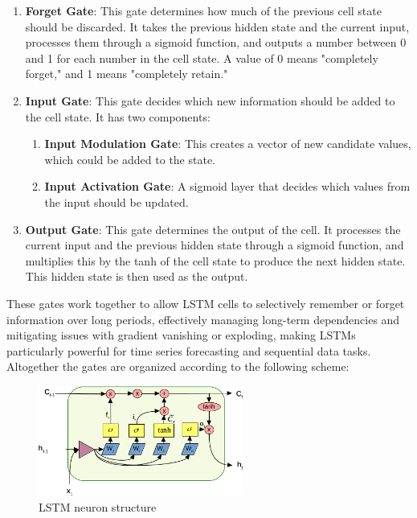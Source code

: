 \documentclass[sn-apa]{sn-jnl}%
\begin{document}
\begin{enumerate}
\item \textbf{Forget Gate}: This gate determines how much of the previous cell state should be discarded. It takes the previous hidden state and the current input, processes them through a sigmoid function, and outputs a number between 0 and 1 for each number in the cell state. A value of 0 means "completely forget," and 1 means "completely retain."

\item \textbf{Input Gate}: This gate decides which new information should be added to the cell state. It has two components:
\begin{enumerate}
\item \textbf{Input Modulation Gate}: This creates a vector of new candidate values, which could be added to the state.
\item \textbf{Input Activation Gate}: A sigmoid layer that decides which values from the input should be updated.
\end{enumerate}
\item \textbf{Output Gate}: This gate determines the output of the cell. It processes the current input and the previous hidden state through a sigmoid function, and multiplies this by the tanh of the cell state to produce the next hidden state. This hidden state is then used as the output.
\end{enumerate}

These gates work together to allow LSTM cells to selectively remember or forget information over long periods, effectively managing long-term dependencies and mitigating issues with gradient vanishing or exploding, making LSTMs particularly powerful for time series forecasting and sequential data tasks. Altogether the gates are organized according to the following scheme:

\begin{figure}[H]
\centering
\includegraphics[width=0.6\textwidth]{lstm_neuron_structure.png}
\caption{LSTM neuron structure}\label{fig1}
\end{figure}
\end{document}
